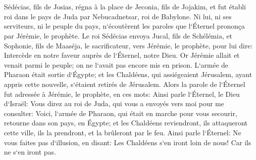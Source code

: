 \chapter{}

\verse Sédécias, fils de Josias, régna à la place de Jeconia, fils de Jojakim, et fut établi roi dans le pays de Juda par Nebucadnetsar, roi de Babylone. 
\verse Ni lui, ni ses serviteurs, ni le peuple du pays, n`écoutèrent les paroles que l`Éternel prononça par Jérémie, le prophète. 
\verse Le roi Sédécias envoya Jucal, fils de Schélémia, et Sophonie, fils de Maaséja, le sacrificateur, vers Jérémie, le prophète, pour lui dire: Intercède en notre faveur auprès de l`Éternel, notre Dieu. 
\verse Or Jérémie allait et venait parmi le peuple; on ne l`avait pas encore mis en prison. 
\verse L`armée de Pharaon était sortie d`Égypte; et les Chaldéens, qui assiégeaient Jérusalem, ayant appris cette nouvelle, s`étaient retirés de Jérusalem. 
\verse Alors la parole de l`Éternel fut adressée à Jérémie, le prophète, en ces mots: 
\verse Ainsi parle l`Éternel, le Dieu d`Israël: Vous direz au roi de Juda, qui vous a envoyés vers moi pour me consulter: Voici, l`armée de Pharaon, qui était en marche pour vous secourir, retourne dans son pays, en Égypte; 
\verse et les Chaldéens reviendront, ils attaqueront cette ville, ils la prendront, et la brûleront par le feu. 
\verse Ainsi parle l`Éternel: Ne vous faites pas d`illusion, en disant: Les Chaldéens s`en iront loin de nous! Car ils ne s`en iront pas. 
